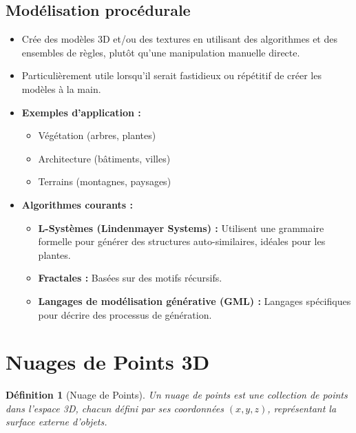 \documentclass{article}
\newtheorem{definition}{Définition} %
\begin{document}
\subsection{Modélisation procédurale}

\begin{itemize}
    \item Crée des modèles 3D et/ou des textures en utilisant des algorithmes et des ensembles de règles, plutôt qu'une manipulation manuelle directe.
    \item Particulièrement utile lorsqu'il serait fastidieux ou répétitif de créer les modèles à la main.
    \item \textbf{Exemples d'application :}
        \begin{itemize}
            \item Végétation (arbres, plantes)
            \item Architecture (bâtiments, villes)
            \item Terrains (montagnes, paysages)
        \end{itemize}
    \item \textbf{Algorithmes courants :}
        \begin{itemize}
            \item \textbf{L-Systèmes (Lindenmayer Systems) :} Utilisent une grammaire formelle pour générer des structures auto-similaires, idéales pour les plantes.
            \item \textbf{Fractales :} Basées sur des motifs récursifs.
            \item \textbf{Langages de modélisation générative (GML) :} Langages spécifiques pour décrire des processus de génération.
        \end{itemize}
\end{itemize}

\section{Nuages de Points 3D}

\begin{definition}[Nuage de Points]
Un nuage de points est une collection de points dans l'espace 3D, chacun défini par ses coordonnées $(x, y, z)$, représentant la surface externe d'objets.
\end{definition}
\end{document}
